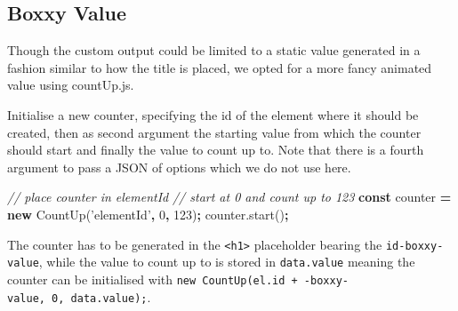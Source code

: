 \documentclass[10pt,]{krantz}
\makeatletter
\newenvironment{Shaded}{\begin{snugshade}}{\end{snugshade}}
\newcommand{\AttributeTok}[1]{\textcolor[rgb]{0.61,0.61,0.61}{#1}}
\newcommand{\CommentTok}[1]{\textcolor[rgb]{0.37,0.37,0.37}{\textit{#1}}}
\newcommand{\DecValTok}[1]{\textcolor[rgb]{0.06,0.06,0.06}{#1}}
\newcommand{\KeywordTok}[1]{\textcolor[rgb]{0.27,0.27,0.27}{\textbf{#1}}}
\newcommand{\NormalTok}[1]{#1}
\newcommand{\OperatorTok}[1]{\textcolor[rgb]{0.43,0.43,0.43}{\textbf{#1}}}
\newcommand{\StringTok}[1]{\textcolor[rgb]{0.5,0.5,0.5}{#1}}
\newcommand{\VariableTok}[1]{\textcolor[rgb]{0,0,0}{#1}}
\newenvironment{kframe}{%
\medskip{}
\setlength{\fboxsep}{.8em}
 \def\at@end@of@kframe{}%
 \ifinner\ifhmode%
  \def\at@end@of@kframe{\end{minipage}}%
  \begin{minipage}{\columnwidth}%
 \fi\fi%
 \def\FrameCommand##1{\hskip\@totalleftmargin \hskip-\fboxsep
 \colorbox{shadecolor}{##1}\hskip-\fboxsep
     \hskip-\linewidth \hskip-\@totalleftmargin \hskip\columnwidth}%
 \MakeFramed {\advance\hsize-\width
   \@totalleftmargin\z@ \linewidth\hsize
   \@setminipage}}%
 {\par\unskip\endMakeFramed%
 \at@end@of@kframe}
\renewenvironment{Shaded}{\begin{kframe}}{\end{kframe}}
\makeatother
\begin{document}
\hypertarget{shiny-output-boxxy-value}{%
\subsection{Boxxy Value}\label{shiny-output-boxxy-value}}

Though the custom output could be limited to a static value generated in a fashion similar to how the title is placed, we opted for a more fancy animated value using countUp.js.

Initialise a new counter, specifying the id of the element where it should be created, then as second argument the starting value from which the counter should start and finally the value to count up to. Note that there is a fourth argument to pass a JSON of options which we do not use here.

\begin{Shaded}
\begin{Highlighting}[]
\CommentTok{// place counter in elementId}
\CommentTok{// start at 0 and count up to 123}
\KeywordTok{const}\NormalTok{ counter }\OperatorTok{=} \KeywordTok{new} \AttributeTok{CountUp}\NormalTok{(}\StringTok{'elementId'}\OperatorTok{,} \DecValTok{0}\OperatorTok{,} \DecValTok{123}\NormalTok{)}\OperatorTok{;}
\VariableTok{counter}\NormalTok{.}\AttributeTok{start}\NormalTok{()}\OperatorTok{;}
\end{Highlighting}
\end{Shaded}

The counter has to be generated in the \texttt{\textless{}h1\textgreater{}} placeholder bearing the \texttt{id-boxxy-value}, while the value to count up to is stored in \texttt{data.value} meaning the counter can be initialised with \texttt{new\ CountUp(el.id\ +\ \textquotesingle{}-boxxy-value\textquotesingle{},\ 0,\ data.value);}.
\end{document}
